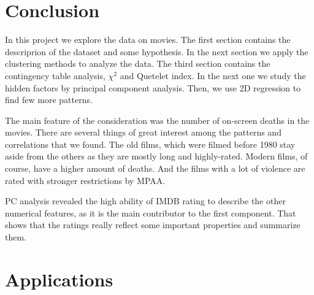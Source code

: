 \documentclass[a4paper,14pt]{article}
\begin{document}
 
\begin{center}
\end{center}


\section{Conclusion}

In this project we explore the data on movies. The first section contains the descriprion of the dataset and some hypothesis. In the next section we apply the clustering methods to analyze the data. The third section contains the contingency table analysis, $\chi^2$ and Quetelet index. In the next one we study the hidden factors by principal component analysis. Then, we use 2D regression to find few more patterns. 

The main feature of the consideration was the number of on-screen deaths in the movies.  
There are several things of great interest among the patterns and correlations that we found. The old films, which were filmed before 1980 stay aside from the others  as they are mostly long and highly-rated. Modern films, of course, have a higher amount of deaths. And the films with a lot of violence are rated with stronger restrictions by MPAA. 

PC analysis revealed the high ability of IMDB rating to describe the other numerical features, as it is the main contributor to the first component. That shows that the ratings really reflect some important properties and summarize them.



\newpage

    
    \section{Applications}
    
\end{document}
